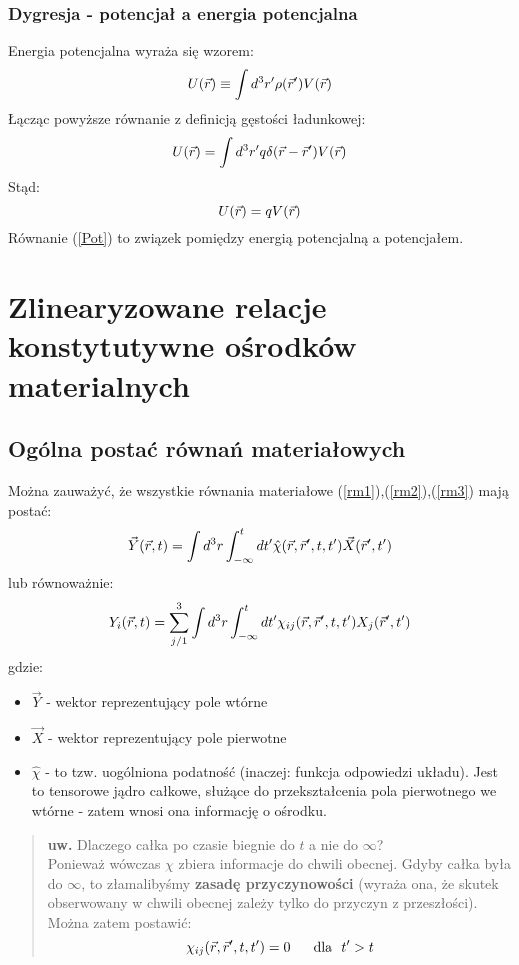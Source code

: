 \subsubsection{Dygresja - potencjał a energia potencjalna}
Energia potencjalna wyraża się wzorem:
\begin{equation} U(\vec{r}) \equiv \int d^3r'\rho(\vec{r}')V(\vec{r}) \end{equation}
Łącząc powyższe równanie z definicją gęstości ładunkowej:
\begin{equation} U(\vec{r}) = \int d^3r'q\delta(\vec{r}-\vec{r}')V(\vec{r})\end{equation}
Stąd:
\begin{equation} U(\vec{r}) = qV(\vec{r}) \label{Pot}\end{equation}
Równanie (\ref{Pot}) to związek pomiędzy energią potencjalną a potencjałem.

\section{Zlinearyzowane relacje konstytutywne ośrodków materialnych}
\subsection{Ogólna postać równań materiałowych}
Można zauważyć, że wszystkie równania materiałowe (\ref{rm1}),(\ref{rm2}),(\ref{rm3}) mają postać:
\begin{equation} \vec{Y}(\vec{r},t)=\int d^3r \int_{-\infty}^t dt' \hat{\chi}(\vec{r},\vec{r}',t,t') \vec{X}(\vec{r}',t') \end{equation}
lub równoważnie:
\begin{equation} {Y}_i(\vec{r},t)=\sum_{j/1}^3 \int d^3r \int_{-\infty}^t dt' {\chi}_{ij}(\vec{r},\vec{r}',t,t') X_j(\vec{r}',t') \end{equation}
gdzie:\\
\begin{itemize} \item $\vec{Y}$ - wektor reprezentujący pole wtórne
\item $\vec{X}$ - wektor reprezentujący pole pierwotne
\item $\hat{\chi} $ - to tzw. uogólniona podatność (inaczej: funkcja odpowiedzi układu). Jest to tensorowe jądro całkowe, służące do przekształcenia pola pierwotnego we wtórne - zatem wnosi ona informację o ośrodku.
\end{itemize}
\begin{verse}\textbf{uw.}
Dlaczego całka po czasie biegnie do $t$ a nie do $\infty$? \\
Ponieważ wówczas $\chi$ zbiera informacje do chwili obecnej. Gdyby całka była do $\infty$, to złamalibyśmy \textbf{zasadę przyczynowości} (wyraża ona, że skutek obserwowany w chwili obecnej zależy tylko do przyczyn z przeszłości). \\
Można zatem postawić:
\begin{equation}\chi_{ij}(\vec{r},\vec{r}',t,t')=0 \text{ ~~~~dla~ } t'>t\end{equation}
\end{verse}

